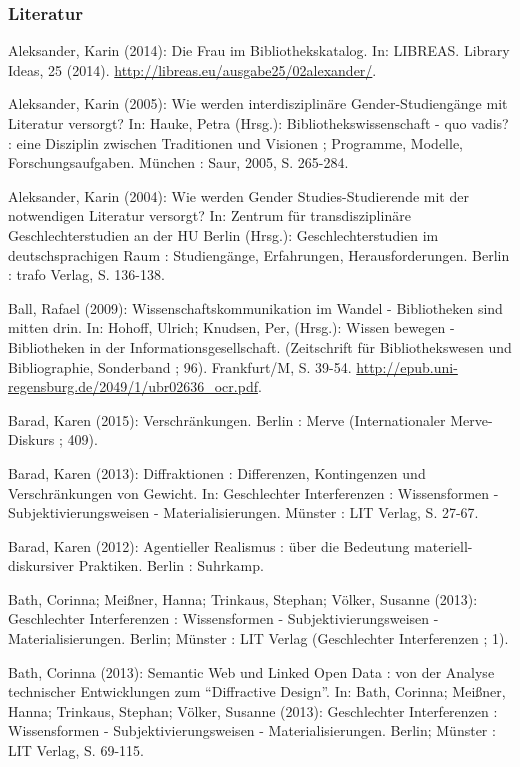 \subsubsection{Literatur}\label{literatur}

Aleksander, Karin (2014): Die Frau im Bibliothekskatalog. In: LIBREAS.
Library Ideas, 25 (2014).
\url{http://libreas.eu/ausgabe25/02alexander/}.

Aleksander, Karin (2005): Wie werden interdisziplinäre
Gender-Studiengänge mit Literatur versorgt? In: Hauke, Petra (Hrsg.):
Bibliothekswissenschaft - quo vadis? : eine Disziplin zwischen
Traditionen und Visionen ; Programme, Modelle, Forschungsaufgaben.
München : Saur, 2005, S. 265-284.

Aleksander, Karin (2004): Wie werden Gender Studies-Studierende mit der
notwendigen Literatur versorgt? In: Zentrum für transdisziplinäre
Geschlechterstudien an der HU Berlin (Hrsg.): Geschlechterstudien im
deutschsprachigen Raum : Studiengänge, Erfahrungen, Herausforderungen.
Berlin : trafo Verlag, S. 136-138.

Ball, Rafael (2009): Wissenschaftskommunikation im Wandel - Bibliotheken
sind mitten drin. In: Hohoff, Ulrich; Knudsen, Per, (Hrsg.): Wissen
bewegen - Bibliotheken in der Informationsgesellschaft. (Zeitschrift für
Bibliothekswesen und Bibliographie, Sonderband ; 96). Frankfurt/M, S.
39-54. \url{http://epub.uni-regensburg.de/2049/1/ubr02636_ocr.pdf}.

Barad, Karen (2015): Verschränkungen. Berlin : Merve (Internationaler
Merve-Diskurs ; 409).

Barad, Karen (2013): Diffraktionen : Differenzen, Kontingenzen und
Verschränkungen von Gewicht. In: Geschlechter Interferenzen :
Wissensformen - Subjektivierungsweisen - Materialisierungen. Münster :
LIT Verlag, S. 27-67.

Barad, Karen (2012): Agentieller Realismus : über die Bedeutung
materiell-diskursiver Praktiken. Berlin : Suhrkamp.

Bath, Corinna; Meißner, Hanna; Trinkaus, Stephan; Völker, Susanne
(2013): Geschlechter Interferenzen : Wissensformen -
Subjektivierungsweisen - Materialisierungen. Berlin; Münster : LIT
Verlag (Geschlechter Interferenzen ; 1).

Bath, Corinna (2013): Semantic Web und Linked Open Data : von der
Analyse technischer Entwicklungen zum \enquote{Diffractive Design}. In:
Bath, Corinna; Meißner, Hanna; Trinkaus, Stephan; Völker, Susanne
(2013): Geschlechter Interferenzen : Wissensformen -
Subjektivierungsweisen - Materialisierungen. Berlin; Münster : LIT
Verlag, S. 69-115.


